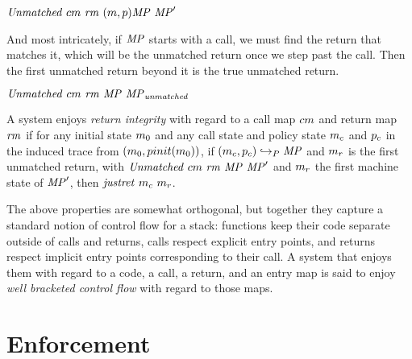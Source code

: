 \documentclass[acmsmall,review,anonymous]{acmart}\settopmatter{printfolios=true,printccs=false,printacmref=false}
\begin{document}
           {\(\mathit{Unmatched}\ \callmap\ \retmap\
            \mpstate{\mach}{\pol}\MPT\ \MPT'\)}

And most intricately, if \(\mathit{MP}\) starts with a call, we must find the
return that matches it, which will be the unmatched return once we
step past the call. Then the first unmatched return beyond it is the
true unmatched return.

            {\(\mathit{Unmatched}\ \callmap\ \retmap\ \MPT\ \MPT_{\mathit{unmatched}}\)}

A system enjoys {\em return integrity} with regard to a call map
\(cm\) and return map \(\mathit{rm}\) if for any initial state
\(m_0\) and any call state and policy state \(m_c\) and
\(p_c\) in the induced trace from
\((m_0,pinit(m_0))\), if \((m_c,p_c)
\hookrightarrow_P \mathit{MP}\) and \(m_r\) is the first unmatched
return, with \(\mathit{Unmatched}\ \callmap\ \retmap\ \MPT \ \MPT'\)
and \(m_r\) the first machine state of \(\mathit{MP}'\), then
\(\mathit{justret}\ m_c\ m_r\).

The above properties are somewhat orthogonal, but together they
capture a standard notion of control flow for a stack: functions keep
their code separate outside of calls and returns, calls respect
explicit entry points, and returns respect implicit entry points
corresponding to their call.  A system that enjoys them with regard to
a code, a call, a return, and an entry map is said to enjoy {\em well
  bracketed control flow} with regard to those maps.


\section{Enforcement}
\label{sec:enforcement}
\end{document}
